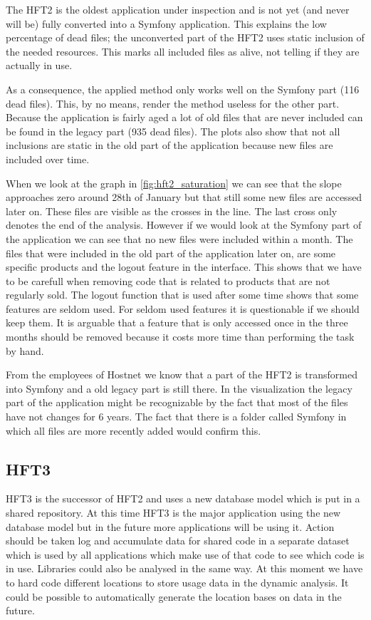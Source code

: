 The HFT2 is the oldest application under inspection and is not yet (and never will be) fully converted into a Symfony application. This explains the low percentage of dead files; the unconverted part of the HFT2 uses static inclusion of the needed resources. This marks all included files as alive, not telling if they are actually in use.



As a consequence, the applied method only works well on the Symfony part (116 dead files). This, by no means, render the method useless for the other part. Because the application is fairly aged a lot of old files that are never included can be found in the legacy part (935 dead files). The plots also show that not all inclusions are static in the old part of the application because new files are included over time.

When we look at the graph in \autoref{fig:hft2_saturation} we can see that the slope approaches zero around 28th of January but that still some new files are accessed later on. These files are visible as the crosses in the line. The last cross only denotes the end of the analysis. However if we would look at the Symfony part of the application we can see that no new files were included within a month. The files that were included in the old part of the application later on, are some specific products and the logout feature in the interface. This shows that we have to be carefull when removing code that is related to products that are not regularly sold. The logout function that is used after some time shows that some features are seldom used. For seldom used features it is questionable if we should keep them. It is arguable that a feature that is only accessed once in the three months should be removed because it costs more time than performing the task by hand.

From the employees of Hostnet we know that a part of the HFT2 is transformed into Symfony and a old legacy part is still there. In the visualization the legacy part of the application might be recognizable by the fact that most of the files have not changes for 6 years. The fact that there is a folder called Symfony in which all files are more recently added would confirm this.

\subsection*{HFT3}
HFT3 is the successor of HFT2 and uses a new database model which is put in a shared repository. At this time HFT3 is the major application using the new database model but in the future more applications will be using it. Action should be taken log and accumulate data for shared code in a separate dataset which is used by all applications which make use of that code to see which code is in use. Libraries could also be analysed in the same way. At this moment we have to hard code different locations to store usage data in the dynamic analysis. It could be possible to automatically generate the location bases on  \vcs data in the future.


